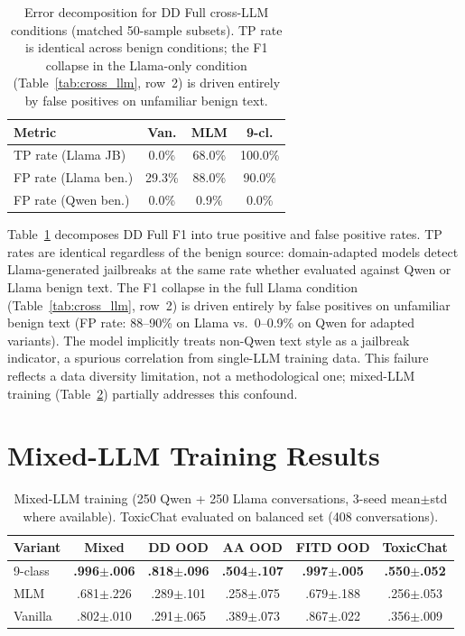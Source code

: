 \begin{table}[ht]
\centering
\footnotesize
\caption{Error decomposition for DD Full cross-LLM conditions (matched 50-sample subsets). TP rate is identical across benign conditions; the F1 collapse in the Llama-only condition (Table~\ref{tab:cross_llm}, row~2) is driven entirely by false positives on unfamiliar benign text.}
\label{tab:cross_llm_error}
\begin{tabular}{@{}lccc@{}}
\toprule
\textbf{Metric} & Van. & MLM & 9-cl. \\
\midrule
TP rate (Llama JB) & 0.0\% & 68.0\% & 100.0\% \\
FP rate (Llama ben.) & 29.3\% & 88.0\% & 90.0\% \\
FP rate (Qwen ben.) & 0.0\% & 0.9\% & 0.0\% \\
\bottomrule
\end{tabular}
\end{table}

Table~\ref{tab:cross_llm_error} decomposes DD Full F1 into true positive and false positive rates. TP rates are identical regardless of the benign source: domain-adapted models detect Llama-generated jailbreaks at the same rate whether evaluated against Qwen or Llama benign text. The F1 collapse in the full Llama condition (Table~\ref{tab:cross_llm}, row~2) is driven entirely by false positives on unfamiliar benign text (FP rate: 88--90\% on Llama vs.\ 0--0.9\% on Qwen for adapted variants). The model implicitly treats non-Qwen text style as a jailbreak indicator, a spurious correlation from single-LLM training data. This failure reflects a data diversity limitation, not a methodological one; mixed-LLM training (Table~\ref{tab:mixed_llm}) partially addresses this confound.

\section{Mixed-LLM Training Results}
\label{app:mixed_llm}

\begin{table}[ht]
\centering
\footnotesize
\caption{Mixed-LLM training (250 Qwen + 250 Llama conversations, 3-seed mean$\pm$std where available). ToxicChat evaluated on balanced set (408 conversations).}
\label{tab:mixed_llm}
\begin{tabular}{@{}lccccc@{}}
\toprule
\textbf{Variant} & Mixed & DD OOD & AA OOD & FITD OOD & ToxicChat \\
\midrule
9-class & \textbf{.996$\pm$.006} & \textbf{.818$\pm$.096} & \textbf{.504$\pm$.107} & \textbf{.997$\pm$.005} & \textbf{.550$\pm$.052} \\
MLM & .681$\pm$.226 & .289$\pm$.101 & .258$\pm$.075 & .679$\pm$.188 & .256$\pm$.053 \\
Vanilla & .802$\pm$.010 & .291$\pm$.065 & .389$\pm$.073 & .867$\pm$.022 & .356$\pm$.009 \\
\bottomrule
\end{tabular}
\end{table}

